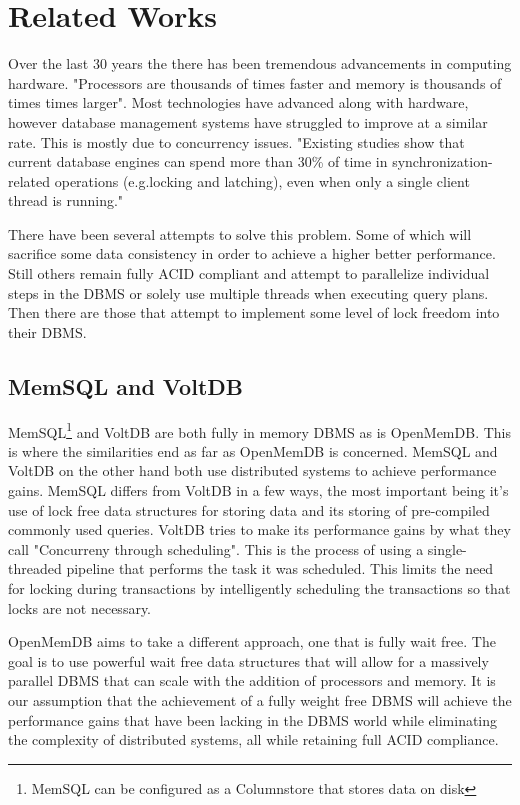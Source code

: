 \documentclass[letter,11pt]{article}
\begin{document}
\section{Related Works}
Over the last 30 years the there has been tremendous advancements in computing
hardware. "Processors are thousands of times faster and memory is thousands of
times times larger"\cite{stonebraker2007end}. Most technologies have advanced 
along with hardware, however database management systems have struggled to improve
at a similar rate. This is mostly due to concurrency issues. "Existing studies show
that current database engines can spend more than 30\% of time in 
synchronization-related operations (e.g.locking and latching), even when only a 
single client thread is running."\cite{soares2015database}
\par\vspace{\baselineskip}
There have been several attempts to solve this problem. Some of which will sacrifice
some data consistency in order to achieve a higher better performance. Still others
remain fully ACID compliant and attempt to parallelize individual steps in the 
DBMS or solely use multiple threads when executing query plans. Then there are those
that attempt to implement some level of lock freedom into their DBMS.
\par\vspace{\baselineskip}
\subsection{MemSQL and VoltDB}
MemSQL\footnote{MemSQL can be configured as a Columnstore that stores data on disk}
and VoltDB are both fully in memory DBMS as is OpenMemDB. This is where the
similarities end as far as OpenMemDB is concerned. MemSQL and VoltDB on the other 
hand both use distributed systems to achieve performance gains. MemSQL differs from 
VoltDB in a few ways, the most important being it's use of lock free data structures
for storing data and its storing of pre-compiled commonly used queries\cite{MemSQL}.
VoltDB tries to make its performance gains by what they call "Concurreny through
scheduling"\cite{VoltDB}. This is the process of using a single-threaded pipeline 
that performs the task it was scheduled. This limits the need for locking during
transactions by intelligently scheduling the transactions so that locks are not
necessary.
\par\vspace{\baselineskip}
OpenMemDB aims to take a different approach, one that is fully wait free. The goal is 
to use powerful wait free data structures that will allow for a massively parallel 
DBMS that can scale with the addition of processors and memory. It is our assumption 
that the achievement of a fully weight free DBMS will achieve the performance gains 
that have been lacking in the DBMS world while eliminating the complexity of 
distributed systems, all while retaining full ACID compliance.

\newpage


\newpage
\end{document}
